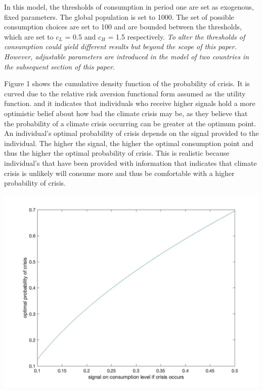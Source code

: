 \documentclass[11pt,preprint, authoryear]{elsarticle}
\let\origfigure\figure
\let\endorigfigure\endfigure
\renewenvironment{figure}[1][2] {
    \expandafter\origfigure\expandafter[H]
} {
    \endorigfigure
}
\numberwithin{equation}{section}
\numberwithin{figure}{section}
\numberwithin{table}{section}
\begin{document}
In this model, the thresholds of consumption in period one are set as
exogenous, fixed parameters. The global population is set to 1000. The
set of possible consumption choices are set to 100 and are bounded
between the thresholds, which are set to \(c_L\) = 0.5 and \(c_H\) = 1.5
respectively. \emph{To alter the thresholds of consumption could yield
different results but beyond the scope of this paper. However,
adjustable parameters are introduced in the model of two countries in
the subsequent section of this paper}.

Figure 1 shows the cumulative density function of the probability of
crisis. It is curved due to the relative risk aversion functional form
assumed as the utility function. and it indicates that individuals who
receive higher signals hold a more optimistic belief about how bad the
climate crisis may be, as they believe that the probability of a climate
crisis occurring can be greater at the optimum point. An individual's
optimal probability of crisis depends on the signal provided to the
individual. The higher the signal, the higher the optimal consumption
point and thus the higher the optimal probability of crisis. This is
realistic because individual's that have been provided with information
that indicates that climate crisis is unlikely will consume more and
thus be comfortable with a higher probability of crisis.

\begin{figure}[H]

{\centering \includegraphics[width=0.8\linewidth]{images/Figure1base} 

}

\caption{Optimal probability of crisis as mapped from the different beliefs of the optimal consumption level}\label{fig:unnamed-chunk-1}
\end{figure}
\end{document}
